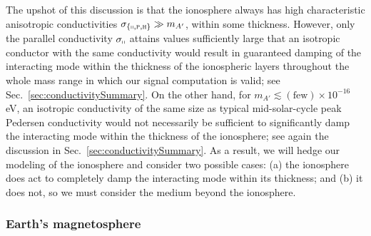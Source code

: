 \documentclass[amsmath,amssymb,aps,10pt,prd,letterpaper,nofootinbib,balancelastpage,notitlepage,superscriptaddress,twocolumn,floatfix]{revtex4-2}
\newcommand{\secref}[2][]{Sec{#1}.~\ref{#2}}		%
\begin{document}
The upshot of this discussion is that the ionosphere always has high characteristic anisotropic conductivities $\sigma_{\{\shortparallel,\textsc{p},\textsc{h}\}} \gg m_{A'}$, within some thickness.
However, only the parallel conductivity $\sigma_\shortparallel$ attains values sufficiently large that an isotropic conductor with the same conductivity would result in guaranteed damping of the interacting mode within the thickness of the ionospheric layers throughout the whole mass range in which our signal computation is valid; see \secref{sec:conductivitySummary}.
On the other hand, for $m_{A'}\lesssim (\text{few})\times 10^{-16}\,$eV, an isotropic conductivity of the same size as typical mid-solar-cycle peak Pedersen conductivity would not necessarily be sufficient to significantly damp the interacting mode within the thickness of the ionosphere; see again the discussion in \secref{sec:conductivitySummary}. 
As a result, we will hedge our modeling of the ionosphere and consider two possible cases: (a) the ionosphere does act to completely damp the interacting mode within its thickness; and (b) it does not, so we must consider the medium beyond the ionosphere.


\subsubsection{Earth's magnetosphere}
\label{sec:magnetosphere}
\end{document}
